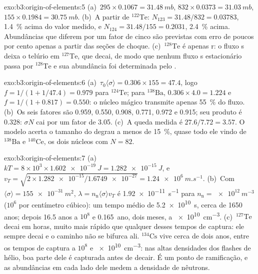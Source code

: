 \begin{solution}{exo:b3:origin-of-elements:5}
(a)~$295\times0.1067 = \qty{31.48}{mb}$, $832\times0.0373 =
\qty{31.03}{mb}$, $155\times0.1984 = \qty{30.75}{mb}$. (b)~A partir de
$^{122}\mathrm{Te}$: $N_{123} = 31.48/832 = \num{0.03783}$, \qty{1.4}{\percent}
acima do valor medido, e $N_{124} = 31.48/155 = \num{0.2031}$,
\qty{2.4}{\percent} acima. Abundâncias que diferem por um fator de cinco são
previstas com erro de poucos por cento apenas a partir das seções de choque.
(c)~$^{128}\mathrm{Te}$ é apenas r: o fluxo s deixa o telúrio em
$^{127}\mathrm{Te}$, que decai, de modo que nenhum fluxo s estacionário passa por
$^{128}\mathrm{Te}$ e sua abundância foi determinada pelo .
\end{solution}

\begin{solution}{exo:b3:origin-of-elements:6}
(a)~$\tau_0\langle\sigma\rangle = 0.306\times155 = 47.4$, logo
$f = 1/(1 + 1/47.4) = \num{0.979}$ para $^{124}\mathrm{Te}$; para
$^{138}\mathrm{Ba}$, $0.306\times4.0 = 1.224$ e $f = 1/(1 + 0.817) =
\num{0.550}$: o núcleo mágico transmite apenas \qty{55}{\percent} do
fluxo. (b)~Os seis fatores são \num{0.959}, \num{0.550}, \num{0.908},
\num{0.771}, \num{0.972} e \num{0.915}; seu produto é \num{0.328}:
$\sigma N$ cai por um fator de \num{3.05}. (c)~A queda medida é
$27.6/7.72 = 3.57$. O modelo acerta o tamanho do degrau a menos de
\qty{15}{\percent}, quase todo ele vindo de $^{138}\mathrm{Ba}$ e
$^{140}\mathrm{Ce}$, os dois núcleos com $N = 82$.
\end{solution}

\begin{solution}{exo:b3:origin-of-elements:7}
(a)~$kT = 8\times10^3\times\qty{1.602e-19}{J} = \qty{1.282e-15}{J}$, e
$v_T = \sqrt{2\times\num{1.282e-15}/\num{1.6749e-27}} =
\qty{1.24e6}{m.s^{-1}}$. (b)~Com $\langle\sigma\rangle =
\qty{155e-31}{m^2}$, $\lambda = n_\mathrm{n}\langle\sigma\rangle v_T$
é \qty{1.92e-11}{s^{-1}} para $n_\mathrm{n} = \qty{e12}{m^{-3}}$
($10^6$ por centímetro cúbico): um tempo médio de \qty{5.2e10}{s}, cerca de
\num{1650} anos; depois \num{16.5} anos a $10^8$ e \num{0.165}~ano,
dois meses, a \qty{e10}{cm^{-3}}. (c)~$^{127}\mathrm{Te}$ decai em
horas, muito mais rápido que qualquer desses tempos de captura: ele sempre decai e
o caminho não se bifurca ali. $^{134}\mathrm{Cs}$ vive cerca de dois
anos, entre os tempos de captura a $10^8$ e \qty{e10}{cm^{-3}}: nas
altas densidades dos flashes de hélio, boa parte dele é capturada
antes de decair. É um ponto de ramificação, e as abundâncias em cada lado
dele medem a densidade de nêutrons.
\end{solution}


